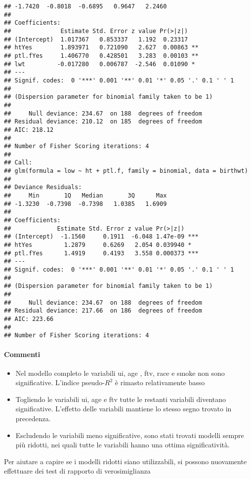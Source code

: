 \documentclass{article}\usepackage[]{graphicx}\usepackage[]{color}
\makeatletter
\newenvironment{kframe}{%
 \def\at@end@of@kframe{}%
 \ifinner\ifhmode%
  \def\at@end@of@kframe{\end{minipage}}%
  \begin{minipage}{\columnwidth}%
 \fi\fi%
 \def\FrameCommand##1{\hskip\@totalleftmargin \hskip-\fboxsep
 \colorbox{shadecolor}{##1}\hskip-\fboxsep
     \hskip-\linewidth \hskip-\@totalleftmargin \hskip\columnwidth}%
 \MakeFramed {\advance\hsize-\width
   \@totalleftmargin\z@ \linewidth\hsize
   \@setminipage}}%
 {\par\unskip\endMakeFramed%
 \at@end@of@kframe}
\newenvironment{knitrout}{}{} %
\makeatother
\begin{document}
\begin{knitrout}
\begin{kframe}
\begin{verbatim}
## -1.7420  -0.8018  -0.6895   0.9647   2.2460  
## 
## Coefficients:
##              Estimate Std. Error z value Pr(>|z|)   
## (Intercept)  1.017367   0.853337   1.192  0.23317   
## htYes        1.893971   0.721090   2.627  0.00863 **
## ptl.fYes     1.406770   0.428501   3.283  0.00103 **
## lwt         -0.017280   0.006787  -2.546  0.01090 * 
## ---
## Signif. codes:  0 '***' 0.001 '**' 0.01 '*' 0.05 '.' 0.1 ' ' 1
## 
## (Dispersion parameter for binomial family taken to be 1)
## 
##     Null deviance: 234.67  on 188  degrees of freedom
## Residual deviance: 210.12  on 185  degrees of freedom
## AIC: 218.12
## 
## Number of Fisher Scoring iterations: 4
## 
## Call:
## glm(formula = low ~ ht + ptl.f, family = binomial, data = birthwt)
## 
## Deviance Residuals: 
##     Min       1Q   Median       3Q      Max  
## -1.3230  -0.7398  -0.7398   1.0385   1.6909  
## 
## Coefficients:
##             Estimate Std. Error z value Pr(>|z|)    
## (Intercept)  -1.1560     0.1911  -6.048 1.47e-09 ***
## htYes         1.2879     0.6269   2.054 0.039940 *  
## ptl.fYes      1.4919     0.4193   3.558 0.000373 ***
## ---
## Signif. codes:  0 '***' 0.001 '**' 0.01 '*' 0.05 '.' 0.1 ' ' 1
## 
## (Dispersion parameter for binomial family taken to be 1)
## 
##     Null deviance: 234.67  on 188  degrees of freedom
## Residual deviance: 217.66  on 186  degrees of freedom
## AIC: 223.66
## 
## Number of Fisher Scoring iterations: 4
\end{verbatim}
\end{kframe}
\end{knitrout}

\paragraph{Commenti}
\begin{itemize}
\item Nel modello completo le variabili ui, age , ftv, race e smoke non sono significative. L'indice pseudo-$R^2$ è rimasto relativamente basso
\item Togliendo le variabili ui, age e ftv tutte le restanti variabili diventano significative. L'effetto delle variabili mantiene lo stesso segno trovato in precedenza.
\item Escludendo le variabili meno significative, sono stati trovati modelli sempre più ridotti, nei quali tutte le variabili hanno una ottima significatività.
\end{itemize}

Per aiutare a capire se i modelli ridotti siano utilizzabili, si possono nuovamente effettuare dei test di rapporto di verosimiglianza
\end{document}
